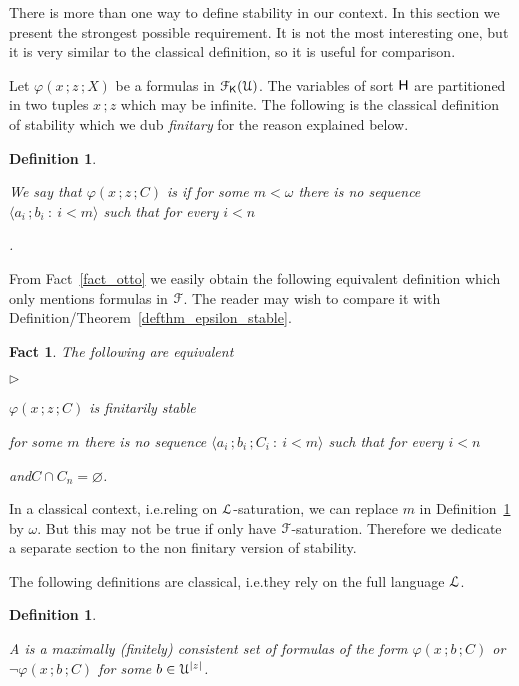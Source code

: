 \documentclass{amsproc}
\newcommand{\mylabel}[1]{{#1}\hfill}
\renewenvironment{itemize}
  {\begin{list}{$\triangleright$}{%
  \setlength{\parskip}{0mm}
  \setlength{\topsep}{.1\baselineskip}
  \setlength{\rightmargin}{0mm}
  \setlength{\listparindent}{0mm}
  \setlength{\itemindent}{0mm}
  \setlength{\labelwidth}{3ex}
  \setlength{\itemsep}{.1\baselineskip}
  \setlength{\parsep}{.1\baselineskip}
  \setlength{\partopsep}{0mm}
  \setlength{\labelsep}{1ex}
  \setlength{\leftmargin}{\labelwidth+\labelsep}
  \let\makelabel\mylabel}}{%
\end{list}}
\newcounter{thm}
\theoremstyle{mio}
\newtheorem{fact}[thm]{Fact}\tcolorboxenvironment{fact}{mythm}
\newtheorem{definition}[thm]{Definition}\tcolorboxenvironment{definition}{mythm}
\renewcommand*{\emph}[1]{%
   \smash{\tikz[baseline]\node[rectangle, fill=teal!25, rounded corners, inner xsep=0.5ex, inner ysep=0.2ex, anchor=base, minimum height = 2.7ex]{\strut #1};}}
\begin{document}
There is more than one way to define stability in our context.
In this section we present the strongest possible requirement.
It is not the most interesting one, but it is very similar to the classical definition, so it is useful for comparison.

Let $\varphi(x\,;z\,;X)$ be a formulas in ${\EuScript F}_{\sf K}({\EuScript U})$.
The variables of sort ${\sf H}$ are partitioned in two tuples $x\,;z$ which may be infinite.
The following is the classical definition of stability which we dub \textit{finitary\/} for the reason explained below.

\begin{definition}\label{def_finitary_stable}\strut
We say that $\varphi(x\,;z\,;C)$ is  \emph{finitarily stable\/} if for some $m<\omega$ there is no sequence $\langle a_i\,;b_i\ :\ i<m\rangle$ such that for every $i<n$\smallskip

.
\end{definition}

From Fact~\ref{fact_otto} we easily obtain the following equivalent definition which only mentions formulas in ${\EuScript F}$.
The reader may wish to compare it with Definition/Theorem~\ref{defthm_epsilon_stable}.

\begin{fact}\label{fact_stability_semicalssic}
  The following are equivalent
  \begin{itemize}
    \item [1.]  $\varphi(x\,;z\,;C)$ is finitarily stable
    \item [2.]  for some $m$ there is no sequence $\langle a_i\,;b_i\,;C_i\ :\ i<m\rangle$ such that for every $i<n$\smallskip

    \quad and\quad $C\cap C_n=\varnothing$.
  \end{itemize}
\end{fact}

In a classical context, i.e.\@ reling on ${\EuScript L}$-saturation, we can replace $m$ in Definition~\ref{def_finitary_stable} by $\omega$.
But this may not be true if only have ${\EuScript F}$-saturation.
Therefore we dedicate a separate section to the non finitary version of stability.

The following definitions are classical, i.e.\@ they rely on the full language ${\EuScript L}$.

\begin{definition}\label{def_globaltype}\strut
  A \emph{global $\varphi(x\,;z\,;C)$-type\/} is a maximally (finitely) consistent set of formulas of the form $\varphi(x\,;b\,;C)$ or $\neg\varphi(x\,;b\,;C)$ for some $b\in{\EuScript U}^{|z|}$.
\end{definition}
\end{document}
